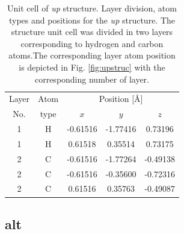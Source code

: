 \documentclass[twocolumn]{article}
\let\Oldsubsection\subsection
\renewcommand{\subsection}{\FloatBarrier\Oldsubsection}
\begin{document}
\begin{table}[tb]
\center
\begin{tabular}{ccccc}\\
\hline
Layer & Atom & \multicolumn{3}{c}{Position [\AA]} \\
\cline{3-5}
No. & type & $x$ & $y$ & $z$  \\
\hline
1 & H & -0.61516 & -1.77416 &  0.73196 \\
1 & H &  0.61518 &  0.35514 &  0.73175 \\
2 & C & -0.61516 & -1.77264 & -0.49138 \\
2 & C & -0.61516 & -0.35600 & -0.72316 \\
2 & C &  0.61516 &  0.35763 & -0.49087 \\
\hline
\end{tabular}
\caption{Unit cell of \emph{up} structure. Layer division, atom types and
positions for the \emph{up} structure. The structure unit cell was divided in
two layers corresponding to hydrogen and carbon atoms.The corresponding layer
atom position is depicted in Fig. \ref{fig:upstruc} with the corresponding
number of layer.}
\label{tab:up-unitcell}
\end{table}



\subsection{alt} %
\label{sec:results-alt}
\end{document}
